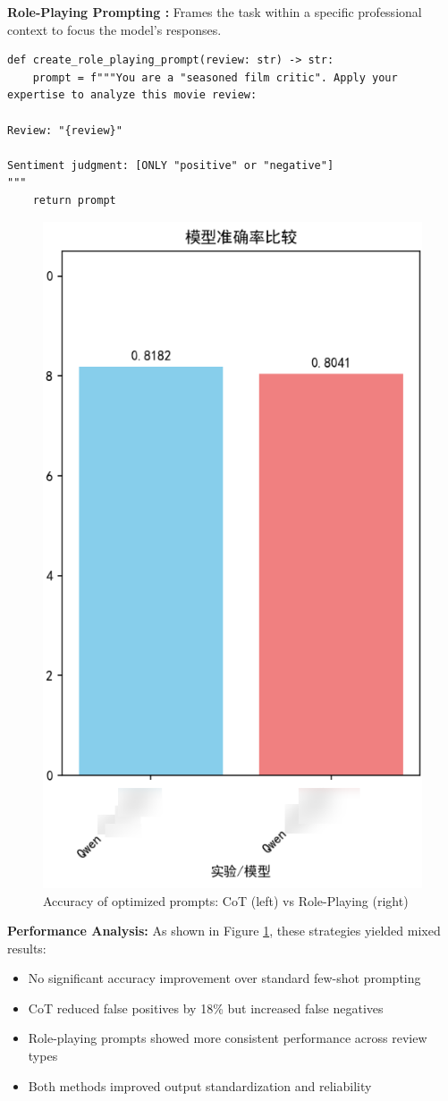 \documentclass{article}
\begin{document}
\textbf{Role-Playing Prompting \cite{Shan2023} :}
Frames the task within a specific professional context to focus the model's responses.

\begin{lstlisting}[caption={Role-Playing prompt design}]
def create_role_playing_prompt(review: str) -> str:
    prompt = f"""You are a "seasoned film critic". Apply your expertise to analyze this movie review:

Review: "{review}"

Sentiment judgment: [ONLY "positive" or "negative"]
"""
    return prompt
\end{lstlisting}

\begin{figure}[h]
    \centering
    \includegraphics[width=0.6\columnwidth]{pic/T2P2B2.1.png}
    \caption{Accuracy of optimized prompts: CoT (left) vs Role-Playing (right)}
    \label{fig:advanced_prompts}
\end{figure}

\textbf{Performance Analysis:}
As shown in Figure \ref{fig:advanced_prompts}, these strategies yielded mixed results:
\begin{itemize}
    \item No significant accuracy improvement over standard few-shot prompting
    \item CoT reduced false positives by 18\% but increased false negatives
    \item Role-playing prompts showed more consistent performance across review types
    \item Both methods improved output standardization and reliability
\end{itemize}
\end{document}

